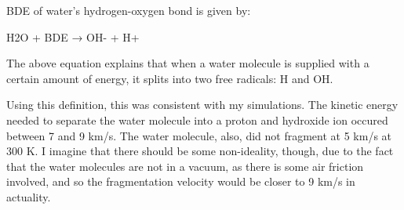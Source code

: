 \documentclass[12pt]{article}
\begin{document}
BDE of water’s hydrogen-oxygen bond is given by:

H2O + BDE → OH- + H+

The above equation explains that when a water molecule is supplied with a certain amount of energy, it splits into two free radicals: H and OH.

Using this definition, this was consistent with my simulations. The kinetic energy needed to separate the water molecule into a proton and hydroxide ion occured between 7 and 9 km/s. The water molecule, also, did not fragment at 5 km/s at 300 K. I imagine that there should be some non-ideality, though, due to the fact that the water molecules are not in a vacuum, as there is some air friction involved, and so the fragmentation velocity would be closer to 9 km/s in actuality.
\end{document}

